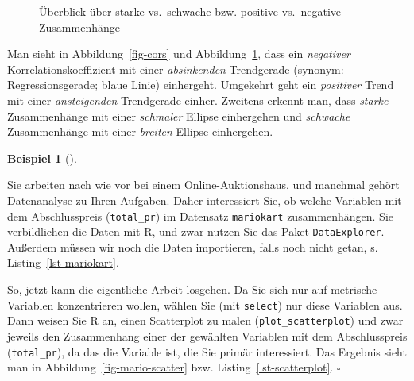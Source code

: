 \documentclass[
  letterpaper,
]{scrbook}
\theoremstyle{definition}
\theoremstyle{definition}
\newtheorem{example}{Beispiel}[chapter]
\theoremstyle{definition}
\theoremstyle{remark}
\begin{document}
\begin{figure}


\caption{\label{fig-cors2}Überblick über starke vs.~schwache bzw.
positive vs.~negative Zusammenhänge}

\end{figure}%

Man sieht in Abbildung~\ref{fig-cors} und Abbildung~\ref{fig-cors2},
dass ein \emph{negativer} Korrelationskoeffizient mit einer
\emph{absinkenden} Trendgerade (synonym: Regressionsgerade; blaue Linie)
einhergeht. Umgekehrt geht ein \emph{positiver} Trend mit einer
\emph{ansteigenden} Trendgerade einher. Zweitens erkennt man, dass
\emph{starke} Zusammenhänge mit einer \emph{schmaler} Ellipse
einhergehen und \emph{schwache} Zusammenhänge mit einer \emph{breiten}
Ellipse einhergehen.

\begin{example}[]\protect\hypertarget{exm-scatter}{}\label{exm-scatter}

Sie arbeiten nach wie vor bei einem Online-Auktionshaus, und manchmal
gehört Datenanalyse zu Ihren Aufgaben. Daher interessiert Sie, ob welche
Variablen mit dem Abschlusspreis (\texttt{total\_pr}) im Datensatz
\texttt{mariokart} zusammenhängen. Sie verbildlichen die Daten mit R,
und zwar nutzen Sie das Paket \texttt{DataExplorer}. Außerdem müssen wir
noch die Daten importieren, falls noch nicht getan, s.
Listing~\ref{lst-mariokart}.

So, jetzt kann die eigentliche Arbeit losgehen. Da Sie sich nur auf
metrische Variablen konzentrieren wollen, wählen Sie (mit
\texttt{select}) nur diese Variablen aus. Dann weisen Sie R an, einen
Scatterplot zu malen (\texttt{plot\_scatterplot}) und zwar jeweils den
Zusammenhang einer der gewählten Variablen mit dem Abschlusspreis
(\texttt{total\_pr}), da das die Variable ist, die Sie primär
interessiert. Das Ergebnis sieht man in
Abbildung~\ref{fig-mario-scatter} bzw. Listing~\ref{lst-scatterplot}.
\(\square\)

\end{example}
\end{document}
